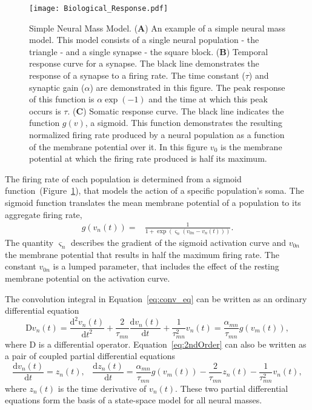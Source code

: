\begin{figure}
	\centering
		\texttt{[image: Biological\_Response.pdf]}
	\caption{Simple Neural Mass Model. (\textbf{A}) An example of a simple neural mass model. This model consists of a single neural population - the triangle - and a single synapse - the square block. (\textbf{B}) Temporal response curve for a synapse. The black line demonstrates the response of a synapse to a firing rate. The time constant ($\tau$) and synaptic gain ($\alpha$) are demonstrated in this figure. The peak response of this function is $\alpha \exp(-1)$ and the time at which this peak occurs is $\tau$. (\textbf{C}) Somatic response curve. The black line indicates the function $g(v)$, a sigmoid. This function demonstrates the resulting normalized firing rate produced by a neural population as a function of the membrane potential over it. In this figure $v_{0}$ is the membrane potential at which the firing rate produced is half its maximum.}
	\label{fig: Simple}
\end{figure}

The firing rate of each population is determined from a sigmoid function~(Figure~\ref{fig: Simple}), that models the action of a specific population's soma. The sigmoid function translates the mean membrane potential of a population to its aggregate firing rate,
\begin{align}\label{eq:sigmoid}
    g\left(v_n(t)\right) =& \frac{1}{1+\exp{\left(\varsigma_n\left(v_{0n} - v_n(t)\right)\right)}}.
\end{align}
The quantity $\varsigma_n$ describes the gradient of the sigmoid activation curve and $v_{0n}$ the membrane potential that results in half the maximum firing rate. The constant $v_{0n}$ is a lumped parameter, that includes the effect of the resting membrane potential on the activation curve. 

The convolution integral in Equation~\ref{eq:conv_eq} can be written as an ordinary differential equation
\begin{equation}\label{eq:2ndOrder}
    \mathrm{D}v_n(t) = \frac{\mathrm{d}^2 v_n(t)}{\mathrm{d}t^2} + \frac{2}{\tau_{mn}}\frac{\mathrm{d} v_n(t)}{\mathrm{d}t} + \frac{1}{\tau_{mn}^2} v_n(t) = \frac{\alpha_{mn}}{\tau_{mn}} g(v_m(t)),
\end{equation}
where $\mathrm{D}$ is a differential operator. Equation~\ref{eq:2ndOrder} can also be written as a pair of coupled partial differential equations
\begin{equation} \label{eq:2ndOrderNMM}
    \frac{\mathrm{d} v_n(t)}{\mathrm{d}t} = z_n(t),\,\,\,\,\,    \frac{\mathrm{d}z_n(t)}{\mathrm{d}t} = \frac{\alpha_{mn}}{\tau_{mn}} g(v_m(t)) - \frac{2}{\tau_{mn}}z_n(t) - \frac{1}{\tau_{mn}^2} v_n(t),
\end{equation}
where $z_n(t)$ is the time derivative of $v_n(t)$. These two partial differential equations form the basis of a state-space model for all neural masses.

